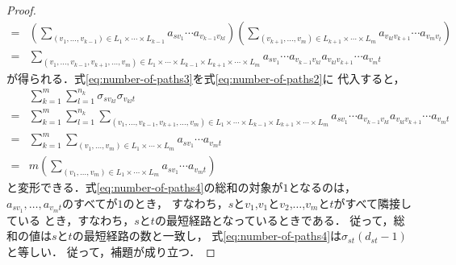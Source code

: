 \begin{proof}
\begin{align}
    =&\left(\sum_{(v_1,\ldots,v_{k-1})\in L_1\times\cdots\times L_{k-1}}
    a_{sv_1}\cdots a_{v_{k-1}v_{kl}}\right)
    \left(\sum_{(v_{k+1},\ldots,v_m)\in L_{k+1}\times\cdots\times L_m}
    a_{v_{kl}v_{k+1}}\cdots a_{v_mv_t}\right)\nonumber\\
    =&\sum_{(v_1,\ldots,v_{k-1},v_{k+1},\ldots,v_m)\in L_1\times\cdots\times L_{k-1}\times L_{k+1}\times\cdots\times L_m}
    a_{sv_1}\cdots a_{v_{k-1}v_{kl}}a_{v_{kl}v_{k+1}}\cdots a_{v_mt}
    \label{eq:number-of-paths3}
  \end{align}
  が得られる．式\eqref{eq:number-of-paths3}を式\eqref{eq:number-of-paths2}に
  代入すると，
  \begin{align}
    &\sum_{k=1}^m\sum_{l=1}^{n_k}\sigma_{sv_{kl}}\sigma_{v_{kl}t}\nonumber\\
    =&\sum_{k=1}^m\sum_{l=1}^{n_k}\sum_{
      (v_1,\ldots,v_{k-1},v_{k+1},\ldots,v_m)\in
      L_1\times\cdots\times L_{k-1}\times L_{k+1}\times\cdots\times L_m
    }a_{sv_1}\cdots a_{v_{k-1}v_{kl}}a_{v_{kl}v_{k+1}}\cdots a_{v_mt}\nonumber\\
    =&\sum_{k=1}^m\sum_{(v_1,\ldots,v_m)\in L_1\times\cdots\times L_m}
    a_{sv_1}\cdots a_{v_mt}\nonumber\\
    =&m\left(\sum_{(v_1,\ldots,v_m)\in L_1\times\cdots\times L_m}
    a_{sv_1}\cdots a_{v_mt}\right)
    \label{eq:number-of-paths4}
  \end{align}
  と変形できる．式\eqref{eq:number-of-paths4}の総和の対象が$1$となるのは，
  $a_{sv_1},\ldots,a_{v_mt}$のすべてが$1$のとき，
  すなわち，$s$と$v_1$,$v_1$と$v_2$,$\ldots$,$v_m$と$t$がすべて隣接している
  とき，すなわち，$s$と$t$の最短経路となっているときである．
  従って，総和の値は$s$と$t$の最短経路の数と一致し，
  式\eqref{eq:number-of-paths4}は$\sigma_{st}(d_{st}-1)$と等しい．
  従って，補題が成り立つ．
\end{proof}

